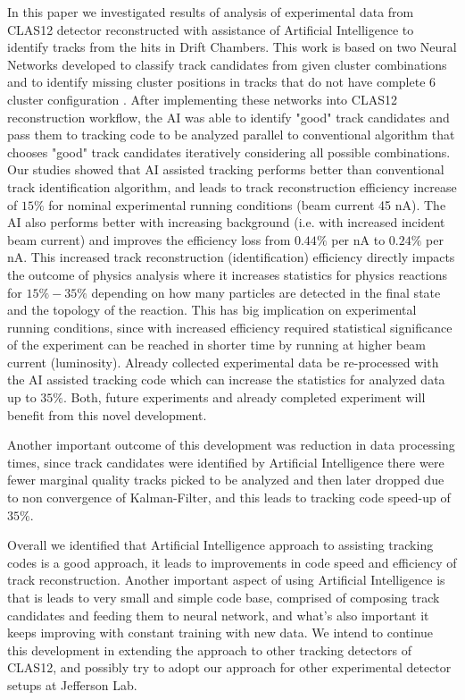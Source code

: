 In this paper we investigated results of analysis of experimental data from CLAS12 detector reconstructed with assistance of Artificial Intelligence
to identify tracks from the hits in Drift Chambers. This work is based on two Neural Networks developed to classify track candidates from
given cluster combinations \cite{Gavalian:2020oxg} and to identify missing cluster positions in tracks that do not have complete 6 cluster configuration \cite{Gavalian:2020xmc}. After implementing these networks into CLAS12 reconstruction workflow, the AI was able to identify "good" track candidates 
and pass them to tracking code to be analyzed parallel to conventional algorithm that chooses "good" track candidates iteratively considering all possible combinations. 
Our studies showed that AI assisted tracking performs better than conventional track identification algorithm, and leads to track reconstruction efficiency increase of $15\%$ for nominal experimental running conditions (beam current 45 nA). The AI also performs better with increasing background (i.e. with increased incident beam current) and improves the efficiency loss from $0.44\%$ per nA to $0.24\%$ per nA.
This increased track reconstruction (identification) efficiency directly impacts the outcome of physics analysis where it increases statistics 
for physics reactions for $15\%-35\%$ depending on how many particles are detected in the final state and the topology of the reaction. This has big implication on experimental running conditions, since with increased efficiency required statistical significance of the experiment can be reached in shorter time by running at higher beam current (luminosity). Already collected experimental data be re-processed with the AI assisted tracking
code which can increase the statistics for analyzed data up to $35\%$. Both, future experiments and already completed experiment will benefit 
from this novel development.

Another important outcome of this development was reduction in data processing times, since track candidates were identified by Artificial Intelligence 
there were fewer marginal quality tracks picked to be analyzed and then later dropped due to non convergence of Kalman-Filter, and this leads to tracking code speed-up of $35\%$.

Overall we identified that Artificial Intelligence approach to assisting tracking codes is a good approach, it leads to improvements in code speed and 
efficiency of track reconstruction. Another important aspect of using Artificial Intelligence is that is leads to very small and simple code base, comprised of composing track candidates and feeding them to neural network, and what's also important it keeps improving with constant training with new data.
We intend to continue this development in extending the approach to other tracking detectors of CLAS12, and possibly try to adopt  our approach for other experimental detector setups at Jefferson Lab.

